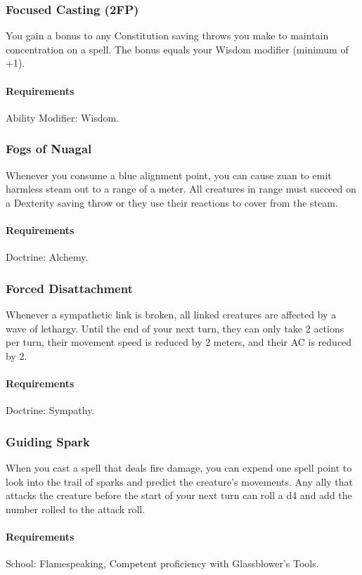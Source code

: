 \subsubsection{Focused Casting (2FP)} \label{feat::focusedcasting}
    You gain a bonus to any Constitution saving throws you make to maintain concentration on a spell.
    The bonus equals your Wisdom modifier (minimum of +1).
    \paragraph{Requirements} Ability Modifier: Wisdom.
\subsubsection{Fogs of Nuagal} \label{feat::fogsofnuagal}
    Whenever you consume a blue alignment point, you can cause zuan to emit harmless steam out to a range of a meter.
    All creatures in range must succeed on a Dexterity saving throw or they use their reactions to cover from the steam.
    \paragraph{Requirements} Doctrine: Alchemy.
\subsubsection{Forced Disattachment} \label{feat::forceddisattachment}
    Whenever a sympathetic link is broken, all linked creatures are affected by a wave of lethargy.
    Until the end of your next turn, they can only take 2 actions per turn, their movement speed is reduced by 2 meters, and their AC is reduced by 2.
    \paragraph{Requirements} Doctrine: Sympathy.
\subsubsection{Guiding Spark} \label{feat::guidingspark}
    When you cast a spell that deals fire damage, you can expend one spell point to look into the trail of sparks and predict the creature's movements.
    Any ally that attacks the creature before the start of your next turn can roll a d4 and add the number rolled to the attack roll.
    \paragraph{Requirements} School: Flamespeaking, Competent proficiency with Glassblower's Tools.
